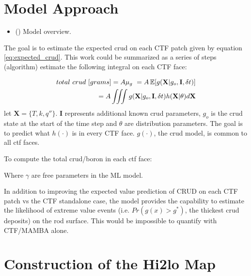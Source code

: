 \section{Model Approach}

\begin{itemize}
	\item (\checkmark) Model overview.
\end{itemize}

The goal is to estimate the expected crud on each CTF patch given by equation \ref{eq:expected_crud}.
This work could be summarized as a series of steps (algorithm) estimate the following integral on each CTF face:

\begin{eqnarray}
        total\ crud\ [grams] = A \mu_g\ = A \operatorname*{\mathbb{E}}[g(\mathbf X|g_o, \mathbf I, \delta t)] \nonumber \\
	= A \iiint g(\mathbf X|g_o, \mathbf I, \delta t) h(\mathbf X|\theta) d \mathbf X
	\label{eq:expected_crud}
\end{eqnarray}
let $\mathbf X= \{T, k, q''\}$. $\mathbf I$ represents additional known crud parameters, $g_o$ is the crud state at the start of the time step and $\theta$ are distribution parameters.  The goal is to predict what $h(\cdot)$ is in every CTF face.  $g(\cdot)$, the crud model, is common to all ctf faces.

To compute the total crud/boron in each ctf face:
\\

\begin{algorithm}[H]

\end{algorithm}
Where $\gamma$ are free parameters in the ML model.
\bigskip

In addition to improving the expected value prediction of CRUD on each CTF patch vs the CTF standalone case, the model provides the capability to estimate the likelihood of extreme value events (i.e. $Pr(g(x) > g^*)$, the thickest crud deposits) on the rod surface.  This would be impossible to quantify with CTF/MAMBA alone.


\section{Construction of the Hi2lo Map}

